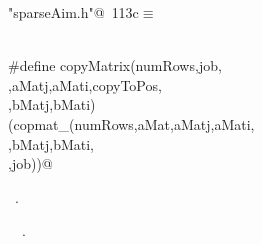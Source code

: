 \documentclass{article}
\begin{document}
\begin{description}
\begin{flushleft}
\begin{minipage}{\linewidth}
\begin{list}{}{\setlength{\itemsep}{-\parsep}\setlength{\itemindent}{-\leftmargin}}
\item{}
\end{list}
\end{minipage}\vspace{4ex}
\end{flushleft}
\item[ copy into another matrix]
\begin{flushleft} \small
\begin{minipage}{\linewidth}\label{scrap202}\raggedright\small
{} \verb@"sparseAim.h"@\nobreak\ {\footnotesize {113c}}$\equiv$
\vspace{-1ex}
\begin{list}{}{} \item
\mbox{}\verb@@\\
\mbox{}\verb@#define copyMatrix(numRows,job, \@\\
\mbox{}\verb@aMat,aMatj,aMati,copyToPos, \@\\
\mbox{}\verb@bMat,bMatj,bMati) \@\\
\mbox{}\verb@(copmat_(numRows,aMat,aMatj,aMati, \@\\
\mbox{}\verb@bMat,bMatj,bMati,\@\\
\mbox{}\verb@copyToPos,job))@\\
\mbox{}\verb@@{\NWsep}
\end{list}
\vspace{-1.5ex}
\footnotesize
\begin{list}{}{\setlength{\itemsep}{-\parsep}\setlength{\itemindent}{-\leftmargin}}
\item \NWtxtFileDefBy\ .
\item \NWtxtIdentsUsed\nobreak\  \verb@job@\nobreak\ .
\item{}
\end{list}
\end{minipage}\vspace{4ex}
\end{flushleft}
\item[ get diagonal elements]

\end{description}
\end{document}
